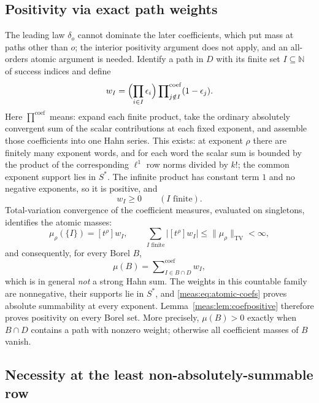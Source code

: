 \documentclass[11pt]{article}
\numberwithin{equation}{section}
\theoremstyle{definition}
\theoremstyle{remark}
\newcommand{\N}{\mathbb N}
\newcommand{\TV}{\mathrm{TV}}
\newcommand{\coef}[2]{[t^{#1}]#2}
\newcommand{\csum}{\mathop{\sum}\nolimits^{\mathrm{coef}}}
\newcommand{\cprod}{\mathop{\prod}\nolimits^{\mathrm{coef}}}
\newcommand{\norm}[1]{\lVert#1\rVert}
\newcommand{\abs}[1]{\lvert#1\rvert}
\begin{document}
\subsection{Positivity via exact path weights}

The leading law $\delta_o$ cannot dominate the later coefficients, which put mass
at paths other than $o$; the interior positivity argument does not apply, and an
all-orders atomic argument is needed. Identify a path in $D$ with its finite set
$I\subseteq\N$ of success indices and define
\begin{equation}\label{meas:eq:path-weight}
 w_I=\Bigl(\prod_{i\in I}\epsilon_i\Bigr)\cprod_{j\notin I}(1-\epsilon_j).
\end{equation}
Here $\cprod$ means: expand each finite product, take the ordinary absolutely
convergent sum of the scalar contributions at each fixed exponent, and assemble
those coefficients into one Hahn series. This exists: at exponent $\rho$ there are
finitely many exponent words, and for each word the scalar sum is bounded by the
product of the corresponding $\ell^1$ row norms divided by $k!$; the common
exponent support lies in $S^*$. The infinite product has constant term $1$ and no
negative exponents, so it is positive, and
\begin{equation}\label{meas:eq:positive-weights}
 w_I\ge0\qquad(I\text{ finite}).
\end{equation}
Total-variation convergence of the coefficient measures, evaluated on singletons,
identifies the atomic masses:
\begin{equation}\label{meas:eq:atomic-coefs}
 \mu_\rho(\{I\})=\coef{\rho}{w_I},\qquad
 \sum_{I\text{ finite}}\abs{\coef{\rho}{w_I}}\le\norm{\mu_\rho}_\TV<\infty,
\end{equation}
and consequently, for every Borel $B$,
\begin{equation}\label{meas:eq:atomic-coef-sum}
 \mu(B)=\csum_{I\in B\cap D}w_I ,
\end{equation}
which is in general \emph{not} a strong Hahn sum. The weights in this
countable family are nonnegative, their supports lie in $S^*$, and
\eqref{meas:eq:atomic-coefs} proves absolute summability at every exponent.
Lemma~\ref{meas:lem:coefpositive} therefore proves positivity on every Borel
set. More precisely, $\mu(B)>0$ exactly when $B\cap D$ contains a path
with nonzero weight; otherwise all coefficient masses of $B$ vanish.

\subsection{Necessity at the least non-absolutely-summable row}
\end{document}
